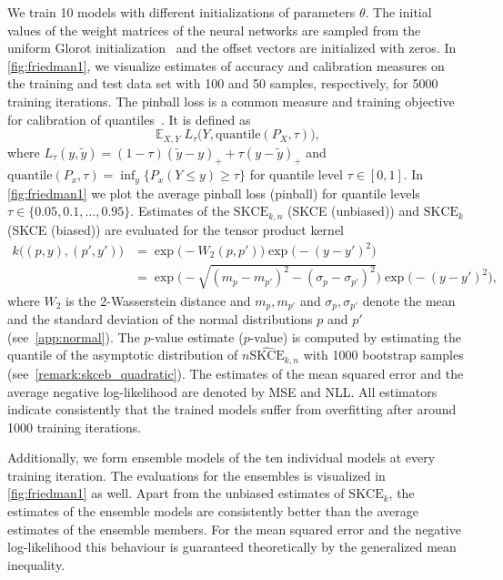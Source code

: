 \documentclass{article}
\DeclareMathOperator{\Exp}{\mathbb{E}}
\begin{document}
We train 10 models with different initializations of parameters $\theta$. The initial values
of the weight matrices of the neural networks are sampled from the uniform Glorot
initialization~\citep{Glorot2010} and the offset vectors are initialized with zeros.
In \cref{fig:friedman1}, we visualize estimates of accuracy and calibration measures
on the training and test data set with 100 and 50 samples, respectively, for
5000 training iterations. The pinball loss is a common measure and
training objective for calibration of quantiles~\citep{Song2019}. It is defined
as
\begin{equation*}
    \Exp_{X,Y} L_{\tau}\big(Y, \mathrm{quantile}(P_X, \tau)\big),
\end{equation*}
where $L_{\tau}(y, \tilde{y}) = (1 - \tau) (\tilde{y} - y)_{+} + \tau (y - \tilde{y})_{+}$
and $\mathrm{quantile}(P_x, \tau) = \inf_{y} \{P_x(Y \leq y) \geq \tau\}$ for
quantile level $\tau \in [0, 1]$.
In \cref{fig:friedman1} we plot the average pinball loss (pinball) for
quantile levels $\tau \in \{0.05, 0.1, \ldots, 0.95\}$. Estimates of the $\mathrm{SKCE}_{k,n}$
(SKCE (unbiased)) and $\mathrm{SKCE}_{k}$ (SKCE (biased)) are evaluated for the tensor product kernel
\begin{equation*}
    \begin{split}
        k\big((p, y), (p', y')\big) &= \exp{\big(-W_2(p, p')\big)} \exp{\big(-(y - y')^2 \big)} \\
        &= \exp{\big(-\sqrt{(m_p - m_{p'})^2 - (\sigma_p - \sigma_{p'})^2}\big)} \exp{\big(- (y - y')^2\big)},
    \end{split}
\end{equation*}
where $W_2$ is the 2-Wasserstein distance and $m_p, m_{p'}$ and $\sigma_p, \sigma_{p'}$ denote
the mean and the standard deviation of the normal distributions $p$ and $p'$ (see~\cref{app:normal}).
The $p$-value estimate ($p$-value) is computed by estimating the quantile of the asymptotic distribution
of $n \widehat{\mathrm{SKCE}}_{k,n}$ with 1000 bootstrap samples
(see~\cref{remark:skceb_quadratic}). The estimates of the mean squared error
and the average negative log-likelihood are denoted by MSE and NLL.
All estimators indicate consistently that the trained models suffer from overfitting
after around 1000 training iterations.

Additionally, we form ensemble models of the ten individual models at every training
iteration. The evaluations for the ensembles is visualized in \cref{fig:friedman1} as
well. Apart from the unbiased estimates of $\mathrm{SKCE}_k$, the estimates of the
ensemble models are consistently better than the average estimates of the ensemble
members. For the mean squared error and the negative log-likelihood this behaviour
is guaranteed theoretically by the generalized mean inequality.
\end{document}
